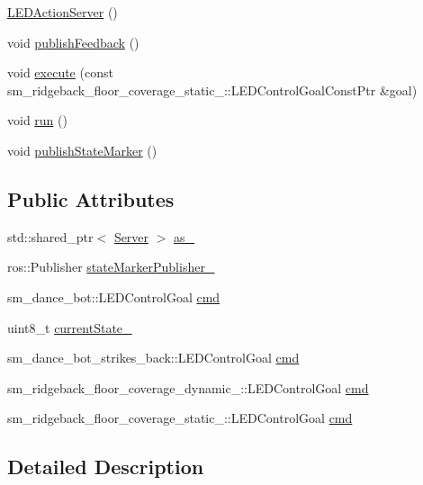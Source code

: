 \begin{DoxyCompactItemize}
\item 
\hyperlink{classLEDActionServer_a6978c43940438b9fd8bfcd6b443092d3}{L\+E\+D\+Action\+Server} ()
\item 
void \hyperlink{classLEDActionServer_a25c93d4e7ecdacbb4f5b090d7789aa36}{publish\+Feedback} ()
\item 
void \hyperlink{classLEDActionServer_adf0a5d17104919195a605c89ee488af1}{execute} (const sm\+\_\+ridgeback\+\_\+floor\+\_\+coverage\+\_\+static\+\_\+::\+L\+E\+D\+Control\+Goal\+Const\+Ptr \&goal)
\item 
void \hyperlink{classLEDActionServer_ae8e1b2d4bf0a85eec3ffd1c7d4f08490}{run} ()
\item 
void \hyperlink{classLEDActionServer_a73bb754ac2347c50660624ad92315895}{publish\+State\+Marker} ()
\end{DoxyCompactItemize}
\subsection*{Public Attributes}
\begin{DoxyCompactItemize}
\item 
std\+::shared\+\_\+ptr$<$ \hyperlink{odom__tracker__node_8cpp_a9884574d0480319430f628f79afc0500}{Server} $>$ \hyperlink{classLEDActionServer_a61d21c77642081acf017d4ebd65b2de0}{as\+\_\+}
\item 
ros\+::\+Publisher \hyperlink{classLEDActionServer_a4168a1e4a17eb1d65aaa059ce0c52086}{state\+Marker\+Publisher\+\_\+}
\item 
sm\+\_\+dance\+\_\+bot\+::\+L\+E\+D\+Control\+Goal \hyperlink{classLEDActionServer_a4d3a4c07e7659cdd78228932bb1634d3}{cmd}
\item 
uint8\+\_\+t \hyperlink{classLEDActionServer_a1dc456e987dc331501ad6ff2215661ff}{current\+State\+\_\+}
\item 
sm\+\_\+dance\+\_\+bot\+\_\+strikes\+\_\+back\+::\+L\+E\+D\+Control\+Goal \hyperlink{classLEDActionServer_a219e3a4ae2a09887d601bc9b210294dd}{cmd}
\item 
sm\+\_\+ridgeback\+\_\+floor\+\_\+coverage\+\_\+dynamic\+\_\+::\+L\+E\+D\+Control\+Goal \hyperlink{classLEDActionServer_a38ceb1a2a5898788f4692e3b5fb393b2}{cmd}
\item 
sm\+\_\+ridgeback\+\_\+floor\+\_\+coverage\+\_\+static\+\_\+::\+L\+E\+D\+Control\+Goal \hyperlink{classLEDActionServer_a5c8b4836a7767e8a4ce05198a2a852e1}{cmd}
\end{DoxyCompactItemize}


\subsection{Detailed Description}


